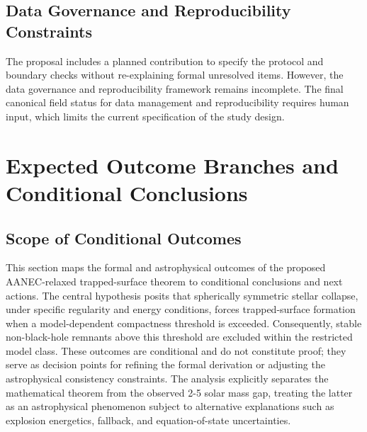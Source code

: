 \documentclass[conference]{IEEEtran}
\begin{document}
\subsection{Data Governance and Reproducibility Constraints}
The proposal includes a planned contribution to specify the protocol and boundary checks without re-explaining formal unresolved items. However, the data governance and reproducibility framework remains incomplete. The final canonical field status for data management and reproducibility requires human input, which limits the current specification of the study design.

\section{Expected Outcome Branches and Conditional Conclusions}
\subsection{Scope of Conditional Outcomes}
This section maps the formal and astrophysical outcomes of the proposed AANEC-relaxed trapped-surface theorem to conditional conclusions and next actions. The central hypothesis posits that spherically symmetric stellar collapse, under specific regularity and energy conditions, forces trapped-surface formation when a model-dependent compactness threshold is exceeded. Consequently, stable non-black-hole remnants above this threshold are excluded within the restricted model class. These outcomes are conditional and do not constitute proof; they serve as decision points for refining the formal derivation or adjusting the astrophysical consistency constraints. The analysis explicitly separates the mathematical theorem from the observed 2-5 solar mass gap, treating the latter as an astrophysical phenomenon subject to alternative explanations such as explosion energetics, fallback, and equation-of-state uncertainties.
\end{document}
